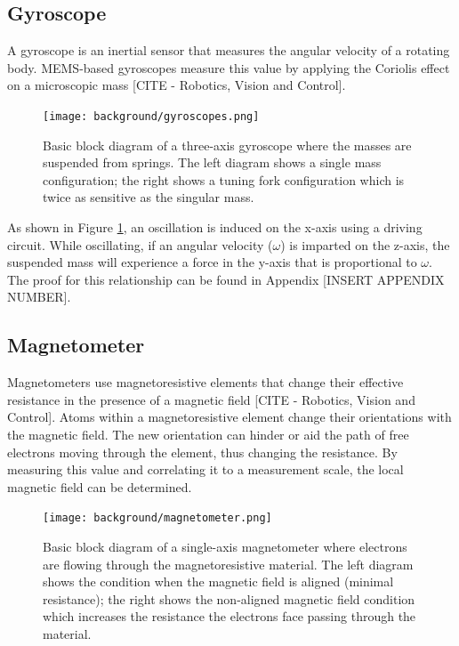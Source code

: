\subsection{Gyroscope} \label{ssec:bkg_gyroscope}
A gyroscope is an inertial sensor that measures the angular velocity of a rotating body.
MEMS-based gyroscopes measure this value by applying the Coriolis effect on a microscopic mass [CITE - Robotics, Vision and Control].

\begin{figure}[h!]
    \caption[Gyroscope block diagram]{Basic block diagram of a three-axis gyroscope where the masses are suspended from springs. The left diagram shows a single mass configuration; the right shows a tuning fork configuration which is twice as sensitive as the singular mass.}
    \label{fig:gyroscopes}
    \centering
    \texttt{[image: background/gyroscopes.png]}
\end{figure}

As shown in Figure \ref{fig:gyroscopes}, an oscillation is induced on the x-axis using a driving circuit.
While oscillating, if an angular velocity ($\omega$) is imparted on the z-axis, the suspended mass will experience a force in the y-axis that is proportional to $\omega$.
The proof for this relationship can be found in Appendix [INSERT APPENDIX NUMBER].

\subsection{Magnetometer} \label{ssec:bkg_magnetometer}
Magnetometers use magnetoresistive elements that change their effective resistance in the presence of a magnetic field [CITE - Robotics, Vision and Control].
Atoms within a magnetoresistive element change their orientations with the magnetic field.
The new orientation can hinder or aid the path of free electrons moving through the element, thus changing the resistance.
By measuring this value and correlating it to a measurement scale, the local magnetic field can be determined.

\begin{figure}[h!]
    \caption[Magnetometer block diagram]{Basic block diagram of a single-axis magnetometer where electrons are flowing through the magnetoresistive material. The left diagram shows the condition when the magnetic field is aligned (minimal resistance); the right shows the non-aligned magnetic field condition which increases the resistance the electrons face passing through the material.}
    \label{fig:magnetometer}
    \centering
    \texttt{[image: background/magnetometer.png]}
\end{figure}

